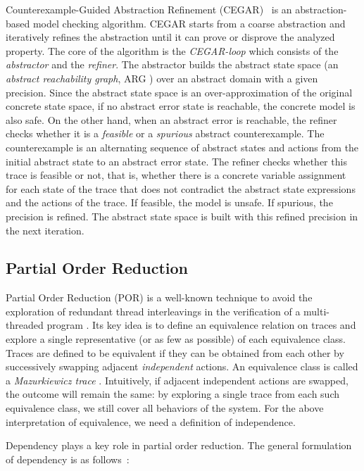 \documentclass[numbook]{svjour3}
\begin{document}
Counterexample-Guided Abstraction Refinement (CEGAR)~\cite{clarke_cegar} is an abstraction-based model checking algorithm. CEGAR starts from a coarse abstraction and iteratively refines the abstraction until it can prove or disprove the analyzed property. The core of the algorithm is the \emph{CEGAR-loop} which consists of the \emph{abstractor} and the \emph{refiner}. The abstractor builds the abstract state space (an \emph{abstract reachability graph}, ARG \cite{cegar-arg}) over an abstract domain with a given precision. Since the abstract state space is an over-approximation of the original concrete state space, if no abstract error state is reachable, the concrete model is also safe. On the other hand, when an abstract error is reachable, the refiner checks whether it is a \emph{feasible} or a \emph{spurious} abstract counterexample. The counterexample is an alternating sequence of abstract states and actions from the initial abstract state to an abstract error state. The refiner checks whether this trace is feasible or not, that is, whether there is a concrete variable assignment for each state of the trace that does not contradict the abstract state expressions and the actions of the trace. If feasible, the model is unsafe. If spurious, the precision is refined. The abstract state space is built with this refined precision in the next iteration.

\subsection{Partial Order Reduction}

Partial Order Reduction (POR) is a well-known technique to avoid the exploration of redundant thread interleavings in the verification of a multi-threaded program \cite{godefroid-thesis}. Its key idea is to define an equivalence relation on traces and explore a single representative (or as few as possible) of each equivalence class. Traces are defined to be equivalent if they can be obtained from each other by successively swapping adjacent \emph{independent} actions. An equivalence class is called a \emph{Mazurkiewicz trace} \cite{mazurkiewicz_trace}. Intuitively, if adjacent independent actions are swapped, the outcome will remain the same: by exploring a single trace from each such equivalence class, we still cover all behaviors of the system. For the above interpretation of equivalence, we need a definition of independence.

Dependency plays a key role in partial order reduction. The general formulation of dependency is as follows~\cite{godefroid-thesis}:
\end{document}
